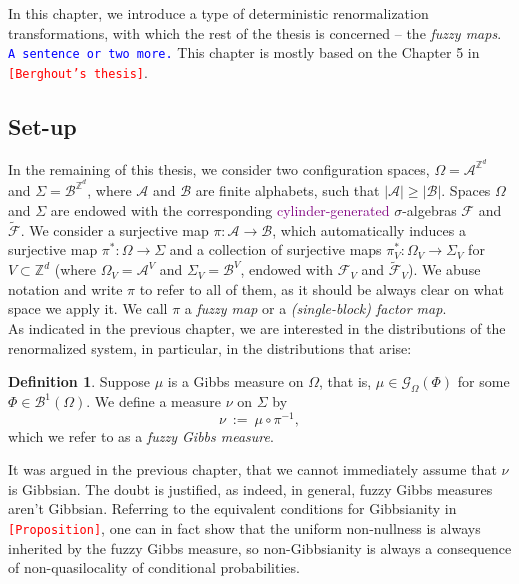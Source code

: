 \documentclass[12pt]{article}
\newcommand{\A}{\mathcal{A}}
\newcommand{\B}{\mathcal{B}}
\newcommand{\BB}{\mathscr{B}}
\newcommand{\F}{\mathcal{F}}
\newcommand{\G}{\mathcal{G}}
\newcommand{\Z}{\mathbb{Z}}
\newcommand{\ra}{\rightarrow}
\newcommand{\1}{\mathbbm{1}}
\newcommand{\5}{\vspace{0.5cm}}
\renewcommand{\tilde}{\widetilde}
\theoremstyle{definition}
\newtheorem{df}[thm]{Definition}
\begin{document}
In this chapter, we introduce a type of deterministic renormalization transformations, with which the rest of the thesis is concerned -- the \textit{fuzzy maps}. \textcolor{blue}{\texttt{A sentence or two more.}} This chapter is mostly based on the Chapter 5 in \textcolor{red}{\texttt{[Berghout's thesis]}}.


\subsection{Set-up}

In the remaining of this thesis, we consider two configuration spaces, $\Omega=\A^{\Z^d}$ and $\Sigma=\B^{\Z^d}$, where $\A$ and $\B$ are finite alphabets, such that $|\A|\geq|\B|$. Spaces $\Omega$ and $\Sigma$ are endowed with the corresponding \textcolor{purple}{cylinder-generated} $\sigma$-algebras $\F$ and $\tilde{\F}$. We consider a surjective map $\pi:\A\ra\B$, which automatically induces a surjective map $\pi^*:\Omega\ra\Sigma$ and a collection of surjective maps $\pi_V^*:\Omega_V\ra\Sigma_V$ for $V\subset\Z^d$ (where $\Omega_V=\A^V$ and $\Sigma_V=\B^V$, endowed with $\F_V$ and $\tilde{\F}_V$). We abuse notation and write $\pi$ to refer to all of them, as it should be always clear on what space we apply it. We call $\pi$ a \textit{fuzzy map} or a \textit{(single-block) factor map}.  \\

As indicated in the previous chapter, we are interested in the distributions of the renormalized system, in particular, in the distributions that arise:
\begin{df}
Suppose $\mu$ is a Gibbs measure on $\Omega$, that is, $\mu\in\G_\Omega(\Phi)$ for some $\Phi\in\BB^1(\Omega)$. We define a measure $\nu$ on $\Sigma$ by
$$\nu ~:=~ \mu \circ \pi^{-1},$$
which we refer to as a \textit{fuzzy Gibbs measure}.
\end{df}
It was argued in the previous chapter, that we cannot immediately assume that $\nu$ is Gibbsian. The doubt is justified, as indeed, in general, fuzzy Gibbs measures aren't Gibbsian. Referring to the equivalent conditions for Gibbsianity in \textcolor{red}{\texttt{[Proposition]}}, one can in fact show that the uniform non-nullness is always inherited by the fuzzy Gibbs measure, so non-Gibbsianity is always a consequence of non-quasilocality of conditional probabilities. \\
\end{document}
